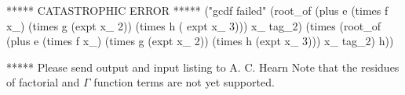 ***** CATASTROPHIC ERROR *****
("gcdf failed" (root_of (plus e (times f x_) (times g (expt x_ 2)) (times h (
expt x_ 3))) x_ tag_2) (times (root_of (plus e (times f x_) (times g (expt
x_ 2)) (times h (expt x_ 3))) x_ tag_2) h))



***** Please send output and input listing to A. C. Hearn
\fi
Note that the residues of factorial and $\Gamma$ function terms are
not yet supported.



